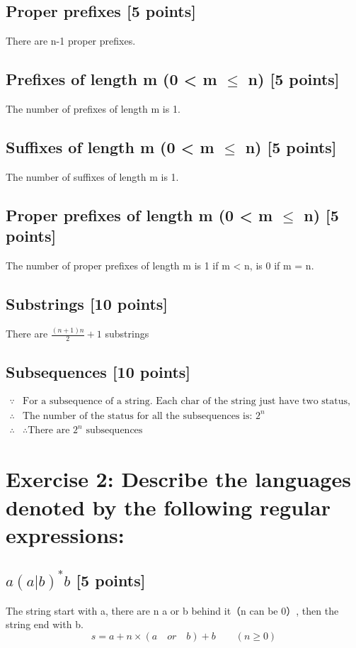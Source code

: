 \documentclass{article}
\begin{document}
        \subsection{Proper prefixes [5 points]}
        There are n-1 proper prefixes.
        \subsection{Prefixes of length m (0 < m $\leq$ n) [5 points]}
        The number of prefixes of length m is 1.
        \subsection{Suffixes of length m (0 < m $\leq$ n) [5 points]}
        The number of suffixes of length m is 1.
        \subsection{Proper prefixes of length m (0 < m $\leq$ n) [5 points]}
        The number of proper prefixes of length m is 1 if m < n, is 0 if m = n.
        \subsection{Substrings [10 points]}
        There are $\frac{(n+1)n}{2} + 1$ substrings
        \subsection{Subsequences [10 points]}
        \begin{align*}
            \because &\text{For a subsequence of a string. Each char of the string just have two status, in the sequence or not in it.}\\
            \therefore &\text{The number of the status for all the subsequences is: } 2^n\\
            \therefore &\text{∴There are } 2^n \text{ subsequences}
        \end{align*}
    \section{Exercise 2: Describe the languages denoted by the following regular expressions:}
        \subsection{$a(a|b)^*b$ [5 points]}
            The string start with a, there are n a or b behind it（n can be 0）, then the string end with b.
            $$s = a + n × (a\quad or\quad b) + b\qquad (n\geq 0)$$
\end{document}
